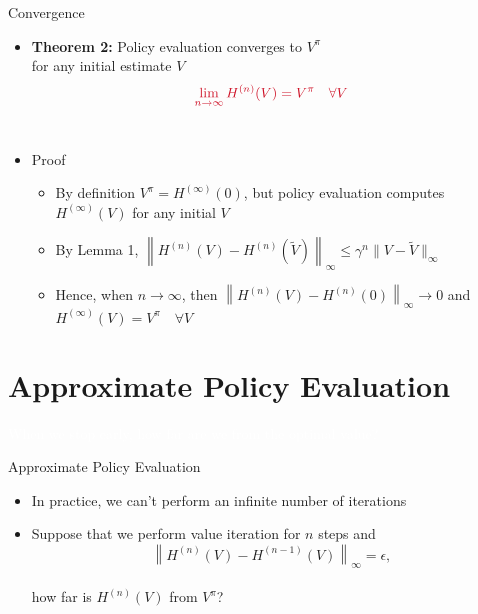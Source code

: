 \documentclass[11pt,table]{beamer}
\begin{document}
\begin{frame}{Convergence}
\vspace{-8mm}
    \begin{itemize}
        \item \textbf{Theorem 2:} \textcolor{red1}{Policy evaluation converges to $V^{\pi}$}\\ for any initial estimate $V$
$$
\textcolor{red1}{\lim_{n \rightarrow \infty} H^{(n)}(V)=V^{\pi} \quad \forall V}
$$\\

\pause

\item Proof



\begin{itemize}
\item By definition $V^{\pi}=H^{(\infty)}(0)$, but policy evaluation computes $H^{(\infty)}(V)$ for any initial $V$\\[2ex]
\item By Lemma 1, $\left\|H^{(n)}(V)-H^{(n)}(\tilde{V})\right\|_{\infty} \leq \gamma^{n}\|V-\tilde{V}\|_{\infty}$\\[2ex]
\item Hence, when $n \rightarrow \infty$, then $\left\|H^{(n)}(V)-H^{(n)}(0)\right\|_{\infty} \rightarrow 0$ and $H^{(\infty)}(V)=V^{\pi} \quad \forall V$
    \end{itemize}
    \end{itemize}
\end{frame}


\section{Approximate Policy Evaluation}
{
\begin{frame}
\centering
\Huge
\textcolor{white}{When we stop early, how far are we from the optimal value?}
\thispagestyle{empty}
\end{frame}
}

\begin{frame}{Approximate Policy Evaluation}

\begin{itemize}
    \item In practice, we can't perform an infinite number of iterations

\item Suppose that we perform value iteration for $n$ steps and $$\left\|H^{(n)}(V)-H^{(n-1)}(V)\right\|_{\infty}=\epsilon,$$\\ 
\textcolor{red1}{how far is $H^{(n)}(V)$ from $V^{\pi}$}? 
\end{itemize}
    
\end{frame}
\end{document}
